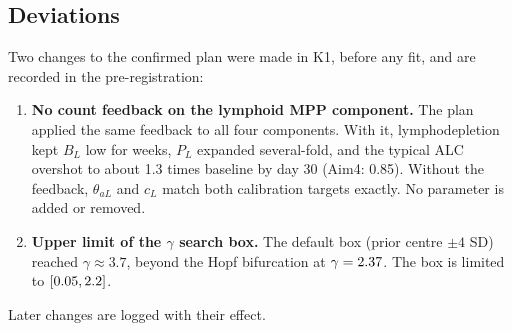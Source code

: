 \documentclass[11pt]{article}
\begin{document}
\subsection{Deviations}\label{sec:deviations}
Two changes to the confirmed plan were made in K1, before any fit, and are recorded in the pre-registration:
\begin{enumerate}
\item \textbf{No count feedback on the lymphoid MPP component.} The plan applied the same feedback to all four components. With it, lymphodepletion kept $B_L$ low for weeks, $P_L$ expanded several-fold, and the typical ALC overshot to about 1.3 times baseline by day 30 (Aim4: 0.85). Without the feedback, $\theta_{aL}$ and $c_L$ match both calibration targets exactly. No parameter is added or removed.
\item \textbf{Upper limit of the $\gamma$ search box.} The default box (prior centre $\pm4$ SD) reached $\gamma\approx3.7$, beyond the Hopf bifurcation at $\gamma=2.37$. The box is limited to $[0.05,2.2]$.
\end{enumerate}
Later changes are logged with their effect.



\end{document}
